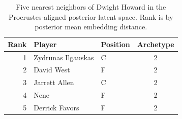 \begin{table}[htbp]
  \centering\small
  \begin{tabular}{rllc}
    \toprule
    Rank & Player & Position & Archetype \\
    \midrule
    1 & Zydrunas Ilgauskas & C & 2 \\
    2 & David West & F & 2 \\
    3 & Jarrett Allen & C & 2 \\
    4 & Nene & F & 2 \\
    5 & Derrick Favors & F & 2 \\
    \bottomrule
  \end{tabular}
  \caption{Five nearest neighbors of Dwight Howard in the Procrustes-aligned posterior latent space. Rank is by posterior mean embedding distance.}
\end{table}

